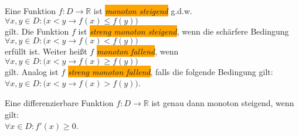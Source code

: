 \begin{Definition}[monoton]
  Eine Funktion $f: D \rightarrow \mathbb{R}$ ist \colorbox{orange}{\emph{monoton steigend}} g.d.w.
  \\[0.2cm]
  \hspace*{1.3cm}
  $\forall x,y \in D:\bigl(x < y \rightarrow f(x) \leq f(y)\bigr)$
  \\[0.2cm]
  gilt.  Die Funktion $f$ ist \colorbox{orange}{\emph{streng monoton steigend}}, wenn die sch\"arfere Bedingung
  \\[0.2cm]
  \hspace*{1.3cm}
  $\forall x,y \in D:\bigl(x < y \rightarrow f(x) < f(y)\bigr)$
  \\[0.2cm]
  erf\"ullt ist.  Weiter hei{\ss}t  $f$ \colorbox{orange}{\emph{monoton fallend}}, wenn
  \\[0.2cm]
  \hspace*{1.3cm}
  $\forall x,y \in D:\bigl(x < y \rightarrow f(x) \geq f(y)\bigr)$
  \\[0.2cm]
  gilt.  Analog ist $f$ \colorbox{orange}{\emph{streng monoton fallend}}, falls die folgende Bedingung gilt:
  \\[0.2cm]
  \hspace*{1.3cm}
  $\forall x,y \in D:\bigl(x < y \rightarrow f(x) > f(y)\bigr)$.
  \eod
\end{Definition}

\begin{Satz} \label{satz:monoton-diff}
  Eine differenzierbare Funktion $f:D \rightarrow \mathbb{R}$ ist genau dann
  monoton steigend, wenn gilt: 
  \\[0.2cm]
  \hspace*{1.3cm} $\forall x \in D: f'(x) \geq 0$.
  \eod
\end{Satz}


